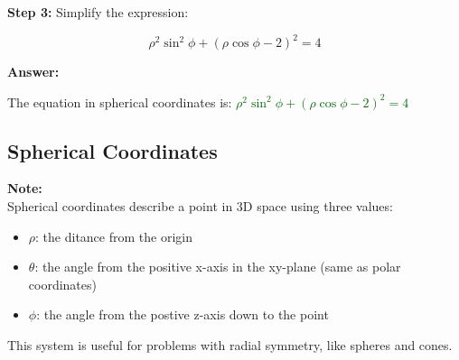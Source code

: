 \documentclass[10pt]{article}                               %
\begin{document}
\begin{adjustwidth}{2em}{0pt}
\begin{adjustwidth}{2em}{0pt}
\begin{examplebox}
\begin{adjustwidth}{2em}{0pt}
                \vspace{0.5em}
            
                \textbf{Step 3:} Simplify the expression:
                \vspace{0.25em}
            
                \[
                \rho^2\sin^2\phi + (\rho\cos\phi - 2)^2 = 4
                \]
            
                \vspace{0.5em}
            
                \textbf{Answer:}
                \vspace{0.25em}
            
                The equation in spherical coordinates is:  
                \textcolor{darkgreen}{\( \rho^2\sin^2\phi + (\rho\cos\phi - 2)^2 = 4 \)}
            
            \end{adjustwidth}
        
        \end{examplebox}

    \end{adjustwidth}


    \subsection*{Spherical Coordinates}

    \begin{adjustwidth}{2em}{0pt}

        \begin{notebox}

            \textbf{Note:} \\
            Spherical coordinates describe a point in 3D space using three values:
                    
            \begin{itemize}
                \item \( \rho \): the ditance from the origin
                \item \( \theta \): the angle from the positive x-axis in the xy-plane (same as polar coordinates)
                \item \( \phi \): the angle from the postive z-axis down to the point
            \end{itemize}

            This system is useful for problems with radial symmetry, like spheres and cones.


\end{notebox}
\end{adjustwidth}
\end{adjustwidth}
\end{document}

